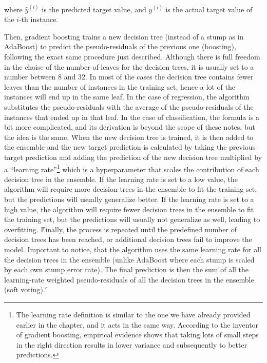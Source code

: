 where $\hat{y}^{(i)}$ is the predicted target value, and $y^{(i)}$ is the actual target value of the $i$-th instance.
\ed

Then, gradient boosting trains a new decision tree (instead of a stump as in AdaBoost) to predict the pseudo-residuals
of the previous one (boosting), following the exact same procedure just described. Although there is full freedom in the
choise of the number of leaves for the decision trees, it is usually set to a number between 8 and 32. In most of the
cases the decision tree contains fewer leaves than the number of instances in the training set, hence a lot of the
instances will end up in the same leaf. In the case of regression, the algorithm substitutes the pseudo-residuals with
the average of the pseudo-residuals of the instances that ended up in that leaf. In the case of classification, the
formula is a bit more complicated, and its derivation is beyond the scope of these notes, but the idea is the same. \v

When the new decision tree is trained, it is then added to the ensemble and the new target prediction is calculated
by taking the previous target prediction and adding the prediction of the new decision tree multiplied by a
``learning rate''\footnote{The learning rate definition is similar to the one we have already provided earlier in the
chapter, and it acts in the same way. According to the inventor of gradient boosting, empirical evidence shows that
taking lots of small steps in the right direction results in lower variance and subsequently to better predictions.}
which is a hyperparameter that scales the contribution of each decision tree in the ensemble. If the learning rate
is set to a low value, the algorithm will require more decision trees in the ensemble to fit the training set, but
the predictions will usually generalize better. If the learning rate is set to a high value, the algorithm will
require fewer decision trees in the ensemble to fit the training set, but the predictions will usually not
generalize as well, leading to overfitting. \v

Finally, the process is repeated until the predefined number of decision trees has been reached, or additional
decision trees fail to improve the model. Important to notice, that the algorithm uses the same learning rate for
all the decision trees in the ensemble (unlike AdaBoost where each stump is scaled by each own stump error rate).
The final prediction is then the sum of all the learning-rate weighted pseudo-residuals of all the decision trees in
the ensemble (soft voting). \v

